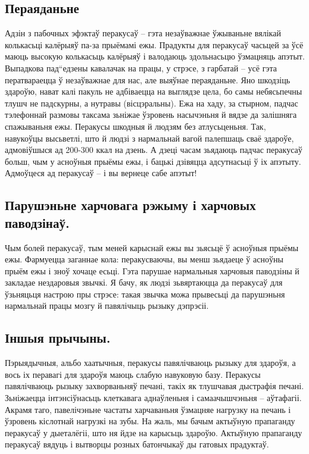 \subsection{Пераяданьне}
Адзін з пабочных эфэктаў перакусаў – гэта незаўважнае ўжываньне вялікай колькасьці калёрыяў па-за прыёмамі ежы. Прадукты для перакусаў часьцей за ўсё маюць высокую колькасьць калёрыяў і валодаюць здольнасьцю ўзмацняць апэтыт. Выпадкова пад“едзены кавалачак на працы, у стрэсе, з гарбатай – усё гэта ператвараецца ў незаўважнае для нас, але выяўнае пераяданьне. Яно шкодзіць здароўю, нават калі пакуль не адбіваецца на выглядзе цела, бо самы небясьпечны тлушч не падскурны, а нутравы (вісцэральны). Ежа на хаду, за стырном, падчас тэлефоннай размовы таксама зьніжае ўзровень насычэньня й вядзе да залішняга спажываньня ежы. Перакусы шкодныя й людзям без атлусьценьня. Так, навукоўцы высьветлі, што й людзі з нармальнай вагой палепшаць сваё здароўе, адмовіўшыся ад 200-300 ккал на дзень. А дзеці часам зьядаюць падчас перакусаў больш, чым у асноўныя прыёмы ежы, і бацькі дзівяцца адсутнасьці ў іх апэтыту. Адмоўцеся ад перакусаў – і вы вернеце сабе апэтыт!

\subsection{Парушэньне харчовага рэжыму і харчовых паводзінаў.}
Чым болей перакусаў, тым меней карыснай ежы вы зьясьцё ў асноўныя прыёмы ежы. Фармуецца заганнае кола: перакусваючы, вы менш зьядаеце ў асноўны прыём ежы і зноў хочаце есьці. Гэта парушае нармальныя харчовыя паводзіны й закладае нездаровыя звычкі. Я бачу, як людзі зьвяртаюцца да перакусаў для ўзьняцьця настрою пры стрэсе: такая звычка можа прывесьці да парушэньня нармальнай працы мозгу й павялічыць рызыку дэпрэсіі.

\subsection{Іншыя прычыны.}
Пэрыядычныя, альбо хаатычныя, перакусы павялічваюць рызыку для здароўя, а вось іх перавагі для здароўя маюць слабую навуковую базу. Перакусы павялічваюць рызыку захворваньняў печані, такіх як тлушчавая дыстрафія печані. Зьніжаецца інтэнсіўнасьць клеткавага аднаўленьня і самаачышчэньня – аўтафагіі. Акрамя таго, павелічэньне частаты харчаваньня ўзмацняе нагрузку на печань і ўзровень кіслотнай нагрузкі на зубы. На жаль, мы бачым актыўную прапаганду перакусаў у дыеталёгіі, што ня йдзе на карысьць здароўю. Актыўную прапаганду перакусаў вядуць і вытворцы розных батончыкаў ды гатовых прадуктаў.

